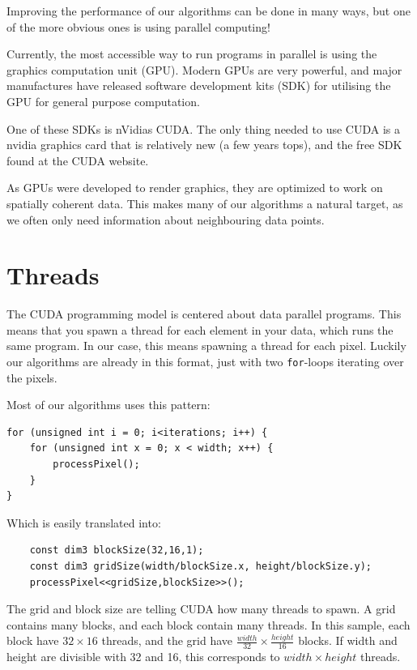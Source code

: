 
Improving the performance of our algorithms can be done in many ways,
but one of the more obvious ones is using parallel computing!

Currently, the most accessible way to run programs in parallel is
using the graphics computation unit (GPU). Modern GPUs are very
powerful, and major manufactures have released software development
kits (SDK) for utilising the GPU for general purpose computation.

One of these SDKs is nVidias CUDA. The only thing needed to
use CUDA is a nvidia graphics card that is relatively new (a few years
tops), and the free SDK found at the CUDA website.

As GPUs were developed to render graphics, they are optimized to work
on spatially coherent data. This makes many of our algorithms a
natural target, as we often only need information about neighbouring
data points.

\section{Threads}

The CUDA programming model is centered about data parallel
programs. This means that you spawn a thread for each element in
your data, which runs the same program. In our case, this means
spawning a thread for each pixel. Luckily our algorithms are already
in this format, just with two \texttt{for}-loops iterating over the pixels.

Most of our algorithms uses this pattern:

\begin{lstlisting}
for (unsigned int i = 0; i<iterations; i++) {
    for (unsigned int x = 0; x < width; x++) {
        processPixel();
    }
}
\end{lstlisting}

Which is easily translated into:
\begin{lstlisting}
    const dim3 blockSize(32,16,1);
    const dim3 gridSize(width/blockSize.x, height/blockSize.y);
    processPixel<<gridSize,blockSize>>();
\end{lstlisting}

The grid and block size are telling CUDA how many threads to
spawn. A grid contains many blocks, and each block contain many
threads. In this sample, each block have $32 \times 16$ threads, and
the grid have $\frac{width}{32} \times \frac{height}{16}$ blocks. If
width and height are divisible with 32 and 16, this corresponds to
$width \times height$ threads. 


